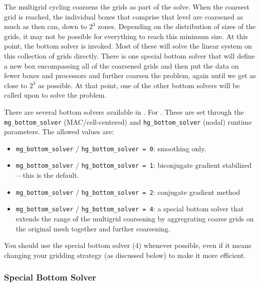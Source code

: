 The multigrid cycling coarsens the grids as part of the solve.  When 
the coarsest grid is reached, the individual boxes that comprise that
level are coarsened as much as then can, down to $2^3$ zones.  Depending
on the distribution of sizes of the grids, it may not be possible for
everything to reach this minimum size.  At this point, the bottom
solver is invoked.  Most of these will solve the linear system
on this collection of grids directly.  There is one special bottom
solver that will define a new box encompassing all of the coarsened
grids and then put the data on fewer boxes and processors and further
coarsen the problem, again until we get as close to $2^3$ as possible.
At that point, one of the other bottom solvers will be called upon
to solve the problem.

There are several bottom solvers available in \amrex.  For \maestro.
These are set through the {\tt mg\_bottom\_solver} (MAC/cell-centered)
and {\tt hg\_bottom\_solver} (nodal) runtime parameters.
The allowed values are:
\begin{itemize}

\item {\tt mg\_bottom\_solver} / {\tt hg\_bottom\_solver = 0}: smoothing only.

\item {\tt mg\_bottom\_solver} / {\tt hg\_bottom\_solver = 1}: biconjugate
  gradient stabilized---this is the default.

\item {\tt mg\_bottom\_solver} / {\tt hg\_bottom\_solver = 2}: conjugate
  gradient method

\item {\tt mg\_bottom\_solver} / {\tt hg\_bottom\_solver = 4}: a special 
  bottom solver that extends the range of the multigrid coarsening
  by aggregrating coarse grids on the original mesh together and
  further coarsening.

\end{itemize}

You should use the special bottom solver (4) whenever possible, even
if it means changing your gridding strategy (as discussed below) to 
make it more efficient.


\subsubsection{Special Bottom Solver}

